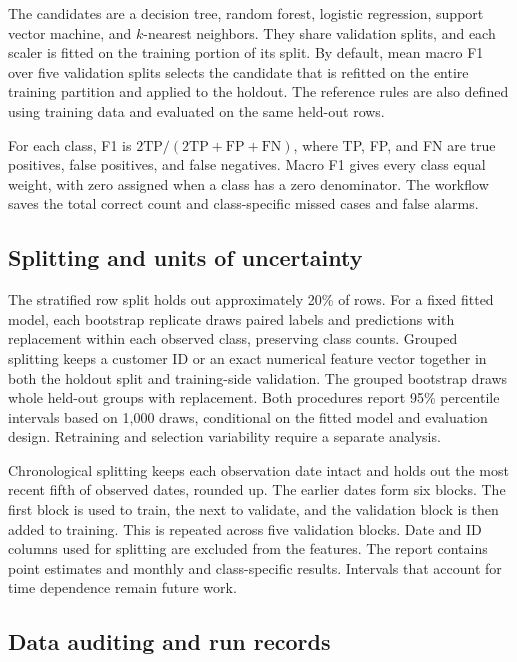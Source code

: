 \documentclass[10pt,a4paper]{article}
\begin{document}
The candidates are a decision tree, random forest, logistic regression, support vector machine, and \(k\)-nearest neighbors. They share validation splits, and each scaler is fitted on the training portion of its split. By default, mean macro F1 over five validation splits selects the candidate that is refitted on the entire training partition and applied to the holdout. The reference rules are also defined using training data and evaluated on the same held-out rows.

For each class, F1 is \(2\mathrm{TP}/(2\mathrm{TP}+\mathrm{FP}+\mathrm{FN})\), where TP, FP, and FN are true positives, false positives, and false negatives. Macro F1 gives every class equal weight, with zero assigned when a class has a zero denominator. The workflow saves the total correct count and class-specific missed cases and false alarms.

\subsection{Splitting and units of uncertainty}

The stratified row split holds out approximately 20\% of rows. For a fixed fitted model, each bootstrap replicate draws paired labels and predictions with replacement within each observed class, preserving class counts. Grouped splitting keeps a customer ID or an exact numerical feature vector together in both the holdout split and training-side validation. The grouped bootstrap draws whole held-out groups with replacement. Both procedures report 95\% percentile intervals based on 1,000 draws, conditional on the fitted model and evaluation design. Retraining and selection variability require a separate analysis. \cite{audit,efron}

Chronological splitting keeps each observation date intact and holds out the most recent fifth of observed dates, rounded up. The earlier dates form six blocks. The first block is used to train, the next to validate, and the validation block is then added to training. This is repeated across five validation blocks. Date and ID columns used for splitting are excluded from the features. The report contains point estimates and monthly and class-specific results. Intervals that account for time dependence remain future work.

\subsection{Data auditing and run records}
\end{document}

